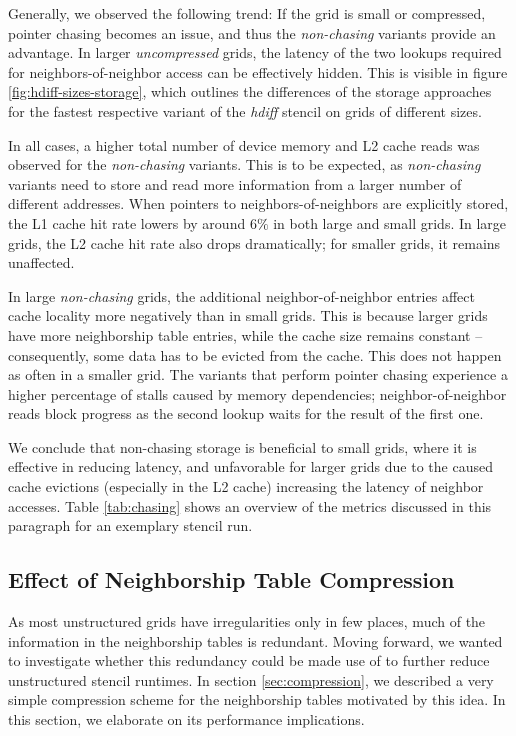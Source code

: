 Generally, we observed the following trend: If the grid is small or compressed, pointer chasing becomes an issue, and thus the \emph{non-chasing} variants provide an advantage. In larger \emph{uncompressed} grids, the latency of the two lookups required for neighbors-of-neighbor access can be effectively hidden. This is visible in figure \ref{fig:hdiff-sizes-storage}, which outlines the differences of the storage approaches for the fastest respective variant of the \emph{hdiff} stencil on grids of different sizes. 

In all cases, a higher total number of device memory and L2 cache reads was observed for the \emph{non-chasing} variants. This is to be expected, as \emph{non-chasing} variants need to store and read more information from a larger number of different addresses. When pointers to neighbors-of-neighbors are explicitly stored, the L1 cache hit rate lowers by around $6\%$ in both large and small grids. In large grids, the L2 cache hit rate also drops dramatically; for smaller grids, it remains unaffected.

In large \emph{non-chasing} grids, the additional neighbor-of-neighbor entries affect cache locality more negatively than in small grids. This is because larger grids have more neighborship table entries, while the cache size remains constant -- consequently, some data has to be evicted from the cache. This does not happen as often in a smaller grid. The variants that perform pointer chasing experience a higher percentage of stalls caused by memory dependencies; neighbor-of-neighbor reads block progress as the second lookup waits for the result of the first one. 

We conclude that non-chasing storage is beneficial to small grids, where it is effective in reducing latency, and unfavorable for larger grids due to the caused cache evictions (especially in the L2 cache) increasing the latency of neighbor accesses. Table \ref{tab:chasing} shows an overview of the metrics discussed in this paragraph for an exemplary stencil run.

\subsection{Effect of Neighborship Table Compression}
\label{sec:results-comp}

As most unstructured grids have irregularities only in few places, much of the information in the neighborship tables is redundant. Moving forward, we wanted to investigate whether this redundancy could be made use of to further reduce unstructured stencil runtimes. In section \ref{sec:compression}, we described a very simple compression scheme for the neighborship tables motivated by this idea. In this section, we elaborate on its performance implications.

